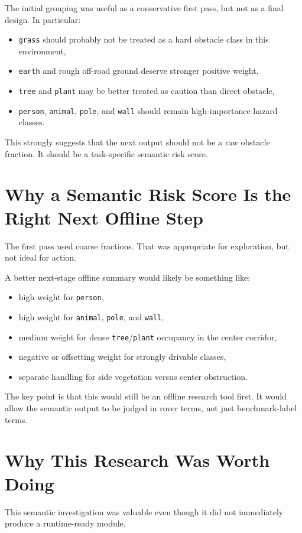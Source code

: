 \documentclass[11pt]{article}
\begin{document}
The initial grouping was useful as a conservative first pass, but not as a final design. In particular:
\begin{itemize}[leftmargin=*]
\item \texttt{grass} should probably not be treated as a hard obstacle class in this environment,
\item \texttt{earth} and rough off-road ground deserve stronger positive weight,
\item \texttt{tree} and \texttt{plant} may be better treated as caution than direct obstacle,
\item \texttt{person}, \texttt{animal}, \texttt{pole}, and \texttt{wall} should remain high-importance hazard classes.
\end{itemize}

This strongly suggests that the next output should not be a raw obstacle fraction. It should be a task-specific semantic risk score.

\section{Why a Semantic Risk Score Is the Right Next Offline Step}
The first pass used coarse fractions. That was appropriate for exploration, but not ideal for action.

A better next-stage offline summary would likely be something like:
\begin{itemize}[leftmargin=*]
\item high weight for \texttt{person},
\item high weight for \texttt{animal}, \texttt{pole}, and \texttt{wall},
\item medium weight for dense \texttt{tree}/\texttt{plant} occupancy in the center corridor,
\item negative or offsetting weight for strongly drivable classes,
\item separate handling for side vegetation versus center obstruction.
\end{itemize}

The key point is that this would still be an offline research tool first. It would allow the semantic output to be judged in rover terms, not just benchmark-label terms.

\section{Why This Research Was Worth Doing}
This semantic investigation was valuable even though it did not immediately produce a runtime-ready module.
\end{document}
